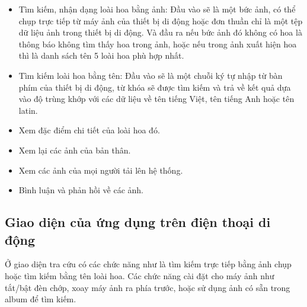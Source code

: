 \documentclass[12pt]{report}
\begin{document}
		\begin{itemize}
			\item Tìm kiếm, nhận dạng loài hoa bằng ảnh: Đầu vào sẽ là một bức ảnh, có thể chụp trực tiếp từ máy ảnh của thiết bị di động
			hoặc đơn thuần chỉ là một tệp dữ liệu ảnh trong thiết bị di động. Và đầu ra nếu bức ảnh đó không có hoa là thông báo không tìm thấy hoa trong ảnh,
			hoặc nếu trong ảnh xuất hiện hoa thì là danh sách tên 5 loài hoa phù hợp nhất.
			\item Tìm kiếm loài hoa bằng tên: Đầu vào sẽ là một chuỗi ký tự nhập từ bàn phím của thiết bị di động, từ khóa sẽ được tìm kiếm và trả về kết quả dựa vào độ trùng khớp với các dữ liệu về tên tiếng Việt, tên tiếng Anh hoặc
			tên latin.
			\item Xem đặc điểm chi tiết của loài hoa đó.
			\item Xem lại các ảnh của bản thân.
			\item Xem các ảnh của mọi người tải lên hệ thống.
			\item Bình luận và phản hồi về các ảnh.
		\end{itemize}
				
		\subsection{Giao diện của ứng dụng trên điện thoại di động}
		Ở giao diện tra cứu có các chức năng như là tìm kiếm trực tiếp bằng ảnh chụp hoặc tìm kiếm bằng tên loài hoa. Các chức năng cài đặt cho máy ảnh như tắt/bật đèn chớp, xoay máy ảnh ra phía trước, hoặc sử dụng ảnh có sẵn trong album để tìm kiếm.
				
\end{document}
